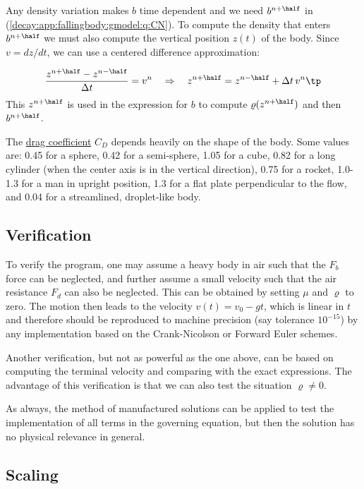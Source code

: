 \documentclass[graybox,sectrefs,envcountresetchap,open=right,final]{svmonodo}
\begin{document}
Any density variation makes $b$ time dependent and we need
$b^{n+\half}$ in (\ref{decay:app:fallingbody:gmodel:q:CN}).
To compute the density that enters
$b^{n+\half}$ we must also compute the vertical
position $z(t)$ of the body. Since $v=dz/dt$, we can use a centered
difference approximation:

\[ \frac{z^{n+\half} - z^{n-\half}}{\Delta t} = v^n
\quad\Rightarrow\quad z^{n+\half} = z^{n-\half}+\Delta t\, v^n\tp\]
This $z^{n+\half}$ is used in the expression for $b$
to compute $\varrho(z^{n+\half})$ and then $b^{n+\half}$.

The \href{{http://en.wikipedia.org/wiki/Drag_coefficient}}{drag coefficient} $C_D$ depends heavily
on the shape of the body.  Some values are: 0.45 for a sphere, 0.42
for a semi-sphere, 1.05 for a cube, 0.82 for a long cylinder (when the
center axis is in the vertical direction), 0.75 for a rocket,
1.0-1.3 for a man in upright position, 1.3 for a flat plate perpendicular
to the flow, and
0.04 for a streamlined, droplet-like body.

\subsection{Verification}

To verify the program, one may assume a heavy body in air such that the $F_b$
force can be neglected, and further assume a small velocity such that the
air resistance $F_d$ can also be neglected. This can be obtained by
setting $\mu$ and $\varrho$ to zero. The motion then leads to
the velocity
$v(t)=v_0 - gt$, which is linear in $t$ and therefore should be
reproduced to machine precision (say tolerance $10^{-15}$) by any
implementation based on the Crank-Nicolson or Forward Euler schemes.

Another verification, but not as powerful as the one above,
can be based on computing the terminal velocity and comparing with
the exact expressions.
The advantage of this verification is that we can also
test the situation $\varrho\neq 0$.

As always, the method of manufactured solutions can be applied to
test the implementation of all terms in the governing equation, but
then the solution has no physical relevance in general.


\subsection{Scaling}
\label{decay:app:drag:scaling}
\end{document}
